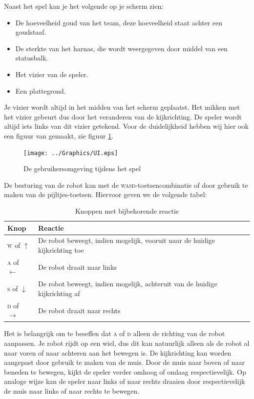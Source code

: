     Naast het spel kan je het volgende op je scherm zien:
    \begin{itemize}
    \item De hoeveelheid goud van het team, deze hoeveelheid staat achter een goudstaaf.
    \item De sterkte van het harnas, die wordt weergegeven door middel van een statusbalk.
    \item Het vizier van de speler.
    \item Een plattegrond.
    \end{itemize}

    Je vizier wordt altijd in het midden van het scherm geplaatst. Het mikken met het vizier gebeurt dus door het veranderen van de kijkrichting. De speler wordt altijd iets links van dit vizier getekend. Voor de duidelijkheid hebben wij hier ook een figuur van gemaakt, zie figuur \ref{fig:UI}.
    \begin{figure}
    \texttt{[image: ../Graphics/UI.eps]}
    \caption{De gebruikersomgeving tijdens het spel}
    \label{fig:UI}
    \end{figure}
    De besturing van de robot kan met de \textsc{wasd}-toetsencombinatie of door gebruik te maken van de pijltjes-toetsen. Hiervoor geven we de volgende tabel:
    \begin{table}[H]
        \small
        \centering
        \begin{tabular}{| l | l |}
        \hline
        Knop & Reactie \\ \hline
        \textsc{w} of $\uparrow$ & De robot beweegt, indien mogelijk, vooruit naar de huidige kijkrichting toe \\ \hline
        \textsc{a} of $\leftarrow$ & De robot draait naar links \\ \hline
        \textsc{s} of $\downarrow$ & De robot beweegt, indien mogelijk, achteruit van de huidige kijkrichting af \\ \hline
        \textsc{d} of $\rightarrow$ & De robot draait naar rechts \\ \hline
        \end{tabular}
        \caption{Knoppen met bijbehorende reactie}
        \label{tab:planning}
    \end{table}

    Het is belangrijk om te beseffen dat \textsc{a} of \textsc{d} alleen de richting van de robot aanpassen. Je robot rijdt op een wiel, dus dit kan natuurlijk alleen als de robot al naar voren of naar achteren aan het bewegen is. De kijkrichting kan worden aangepast door gebruik te maken van de muis. Door de muis naar boven of naar beneden te bewegen, kijkt de speler verder omhoog of omlaag respectievelijk. Op analoge wijze kan de speler naar links of naar rechts draaien door respectievelijk de muis naar links of naar rechts te bewegen.

